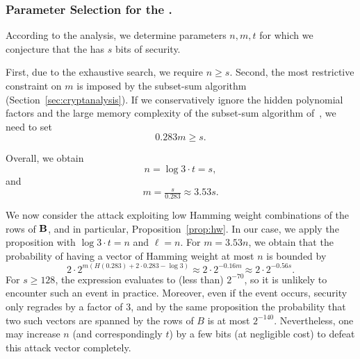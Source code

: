 



\subsubsection{Parameter Selection for the \ttOWF.}
According to the analysis, we determine parameters $n,m,t$ for which
we conjecture that the \ttOWF has $s$ bits of security.

First, due to the exhaustive search, we require $n \geq s$.
Second,
the most restrictive constraint on $m$ is imposed by the subset-sum algorithm (Section~\ref{sec:cryptanalysis}).
If we conservatively ignore the hidden polynomial factors and the large memory
complexity of the subset-sum algorithm of~\cite{BonnetainBSS20}, we need to set
$$0.283m \geq s.$$

Overall, we obtain
$$n = \log 3 \cdot t = s,$$
and $$m = \tfrac{s}{0.283} \approx 3.53 s.$$

We now consider the attack exploiting low Hamming weight combinations of the rows of $\mat{B}$,
and in particular, Proposition~\ref{prop:hw}.
In our case, we apply the proposition with $\log 3 \cdot t = n$ and $\ell = n$.
For $m = 3.53 n$, we obtain that the probability of having a vector of Hamming weight at most $n$ is bounded by
$$2 \cdot 2^{m (H(0.283) + 2 \cdot 0.283 - \log 3)} \approx 2 \cdot 2^{-0.16m} \approx 2 \cdot 2^{- 0.56 s}.$$
For $s \geq 128$, the expression evaluates to (less than) $2^{-70}$, so it is unlikely to encounter such an event in practice.
Moreover, even if the event occurs, security only regrades by a factor of 3, and by the same
proposition the probability that two such vectors are spanned by the rows of $B$ is at most $2^{-140}$.
Nevertheless, one may increase $n$ (and correspondingly $t$)
by a few bits (at negligible cost) to defeat this attack vector completely.


